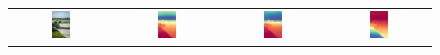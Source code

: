 \documentclass{article}
\begin{document}
\begin{figure}[H]
\begin{tabular}{cccc}
    \includegraphics[width=0.2\textwidth]{images/test-image/outside-01.jpg} &
    \includegraphics[width=0.2\textwidth]{images/trained/outside-01_pred_colored.png} &
    \includegraphics[width=0.2\textwidth]{images/pretrained/outside-01_pred_colored.png} &
    \includegraphics[width=0.2\textwidth]{images/depthmaster/outside-01_pred_colored.jpg} \\


\end{tabular}
\end{figure}
\end{document}
